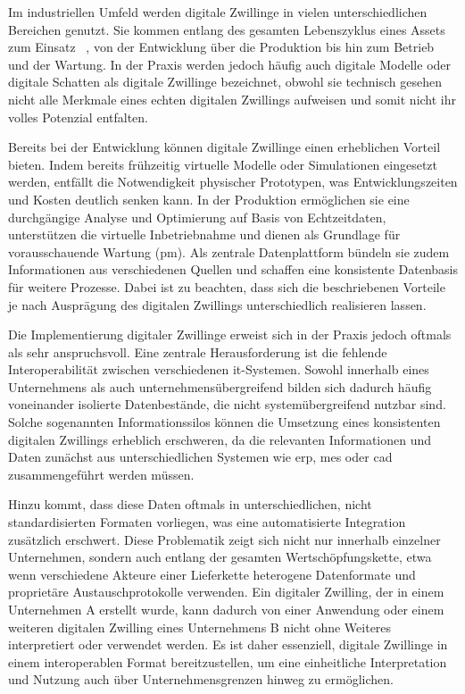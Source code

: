 Im industriellen Umfeld werden digitale Zwillinge in vielen unterschiedlichen Bereichen genutzt.
Sie kommen entlang des gesamten Lebenszyklus eines Assets zum Einsatz%
\pagebreak
~, von der Entwicklung über die Produktion bis hin zum Betrieb und der Wartung.
In der Praxis werden jedoch häufig auch digitale Modelle oder digitale Schatten als digitale Zwillinge bezeichnet, obwohl sie technisch gesehen nicht alle Merkmale eines echten digitalen Zwillings aufweisen und somit nicht ihr volles Potenzial entfalten.

Bereits bei der Entwicklung können digitale Zwillinge einen erheblichen Vorteil bieten. 
Indem bereits frühzeitig virtuelle Modelle oder Simulationen eingesetzt werden, entfällt die Notwendigkeit physischer Prototypen, was Entwicklungszeiten und Kosten deutlich senken kann. 
In der Produktion ermöglichen sie eine durchgängige Analyse und Optimierung auf Basis von Echtzeitdaten, unterstützen die virtuelle Inbetriebnahme und dienen als Grundlage für vorausschauende Wartung (\ac{pm}). 
Als zentrale Datenplattform bündeln sie zudem Informationen aus verschiedenen Quellen und schaffen eine konsistente Datenbasis für weitere Prozesse. \cite{DTForSmartManufacturing}
Dabei ist zu beachten, dass sich die beschriebenen Vorteile je nach Ausprägung des digitalen Zwillings unterschiedlich realisieren lassen.

Die Implementierung digitaler Zwillinge erweist sich in der Praxis jedoch oftmals als sehr anspruchsvoll.
Eine zentrale Herausforderung ist die fehlende Interoperabilität zwischen verschiedenen \ac{it}-Systemen.
Sowohl innerhalb eines Unternehmens als auch unternehmensübergreifend bilden sich dadurch häufig voneinander isolierte Datenbestände, die nicht systemübergreifend nutzbar sind.
Solche sogenannten Informationssilos können die Umsetzung eines konsistenten digitalen Zwillings erheblich erschweren, da die relevanten Informationen und Daten zunächst aus unterschiedlichen Systemen wie \ac{erp}, \ac{mes} oder \ac{cad} zusammengeführt werden müssen.

Hinzu kommt, dass diese Daten oftmals in unterschiedlichen, nicht standardisierten Formaten vorliegen, was eine automatisierte Integration zusätzlich erschwert.
Diese Problematik zeigt sich nicht nur innerhalb einzelner Unternehmen, sondern auch entlang der gesamten Wertschöpfungskette, etwa wenn verschiedene Akteure einer Lieferkette heterogene Datenformate und proprietäre Austauschprotokolle verwenden.
Ein digitaler Zwilling, der in einem Unternehmen A erstellt wurde, kann dadurch von einer Anwendung oder einem weiteren digitalen Zwilling eines Unternehmens B nicht ohne Weiteres interpretiert oder verwendet werden.
Es ist daher essenziell, digitale Zwillinge in einem interope\-rablen Format bereitzustellen, um eine einheitliche Interpretation und Nutzung auch über Unternehmensgrenzen hinweg zu ermöglichen.
\cite{DTandAASConceptsInI4.0}

